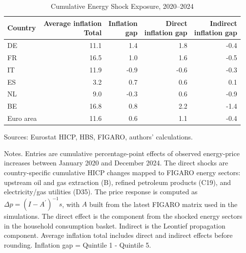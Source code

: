 \begin{table}[H]
\centering
\caption{Cumulative Energy Shock Exposure, 2020--2024}
\scriptsize
\setlength{\tabcolsep}{4.2pt}
\begin{tabular}{lrrrr}
\toprule
Country & \shortstack{Average inflation\\Total} & \shortstack{Inflation\\gap} & \shortstack{Direct\\inflation gap} & \shortstack{Indirect\\inflation gap}
 \\
\midrule
DE & 11.1 & 1.4 & 1.8 & -0.4
 \\
FR & 16.5 & 1.0 & 1.6 & -0.5
 \\
IT & 11.9 & -0.9 & -0.6 & -0.3
 \\
ES & 3.2 & 0.7 & 0.6 & 0.1
 \\
NL & 9.0 & -0.3 & 0.6 & -0.9
 \\
BE & 16.8 & 0.8 & 2.2 & -1.4
 \\
Euro area & 11.6 & 0.6 & 1.1 & -0.4
 \\
\bottomrule
\end{tabular}
\par\vspace{0.35em}\footnotesize\noindent Sources: Eurostat HICP, HBS, FIGARO, authors' calculations.
\par\vspace{0.25em}\footnotesize\noindent Notes. Entries are cumulative percentage-point effects of observed energy-price increases between January 2020 and December 2024. The direct shocks are country-specific cumulative HICP changes mapped to FIGARO energy sectors: upstream oil and gas extraction (B), refined petroleum products (C19), and electricity/gas utilities (D35). The price response is computed as $\Delta p = (I - A^{\prime})^{-1}s$, with $A$ built from the latest FIGARO matrix used in the simulations. The direct effect is the component from the shocked energy sectors in the household consumption basket. Indirect is the Leontief propagation component. Average inflation total includes direct and indirect effects before rounding. Inflation gap = Quintile 1 - Quintile 5.
\end{table}
\vspace{0.6em}
